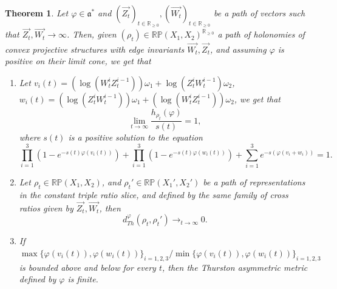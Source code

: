 \documentclass[10pt,a4paper]{amsart}
\newtheorem{thm}{Theorem}
\begin{document}
\begin{thm}
  \label{thm:sl3}
 Let $\varphi \in \mathfrak{a}^*$ and $(\vec{Z_t})_{t \in \mathbb{R}_{\geq 0}}, (\vec{W_t})_{t \in \mathbb{R}_{\geq 0}}$ be a path of vectors such that $\vec{Z_t},\vec{W_t} \to \infty$.
 Then, given $(\rho_t) \in \mathbb{RP}(X_1, X_2)^{\mathbb{R}_{\geq 0}}$ a path of holonomies of convex projective structures with edge invariants $\vec{W_t},\vec{Z_t}$, and assuming $\varphi$ is positive on their limit cone, we get that
   \begin{enumerate}
      \item Let $v_i (t) = (\log (W^i_t Z^{i-1}_t)) \omega_1 + \log (Z^i_t W^{i-1}_t) \omega_2$, $w_i (t) = (\log (Z^i_t W^{i-1}_t)) \omega_1 + (\log (W^i_t Z^{i-1}_t)) \omega_2$, we get that
         $$\lim_{t \to \infty }\frac{h_{\rho_t} (\varphi)}{s(t)} =1,$$
 where $s(t)$ is a positive solution to the equation
         $$\prod_{i=1}^3 (1-e^{-s (t) \varphi (v_i (t))}) + \prod_{i=1}^3 (1-e^{-s (t) \varphi (w_i (t))}) + \sum_{i=1}^3 e^{-s (\varphi (v_i + w_i))} =1.$$
      \item Let $\rho_t \in \mathbb{RP} (X_1, X_2)$, and $\rho_t' \in \mathbb{RP} (X_1', X_2')$ be a path of representations in the constant triple ratio slice, and defined by the same family of cross ratios given by $\vec{Z_t},\vec{W_t}$, then
      $$d_{Th}^\varphi (\rho_t,\rho_t') \to_{t \to \infty} 0.$$
      \item If $\max \{\varphi (v_i (t)),\varphi (w_i (t))\}_{i=1,2,3}/\min \{\varphi (v_i (t)),\varphi (w_i (t))\}_{i=1,2,3}$ is bounded above and below for every $t$, then the Thurston asymmetric metric defined by $\varphi$ is finite.
   \end{enumerate}
\end{thm}
\end{document}
